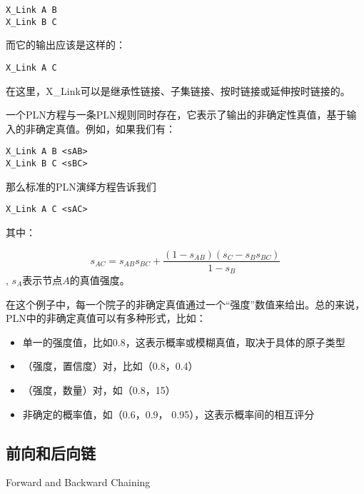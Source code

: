 {\tt\begin{small}\begin{lstlisting}
X_Link A B
X_Link B C
\end{lstlisting}\end{small}}

而它的输出应该是这样的：

{\tt\begin{small}\begin{lstlisting}
X_Link A C
\end{lstlisting}\end{small}}

在这里，X\_Link可以是继承性链接、子集链接、按时链接或延伸按时链接的。

一个PLN方程与一条PLN规则同时存在，它表示了输出的非确定性真值，基于输入的非确定真值。例如，如果我们有：

{\tt\begin{small}\begin{lstlisting}
X_Link A B <sAB>
X_Link B C <sBC>
\end{lstlisting}\end{small}}



那么标准的PLN演绎方程告诉我们

{\tt\begin{small}\begin{lstlisting}
X_Link A C <sAC>
\end{lstlisting}\end{small}}

其中： 

$$
s_{AC}=s_{AB}s_{BC}+\frac{\left(1-s_{AB}\right)\left(s_C-s_Bs_{BC}\right)}{1-s_B}
$$, $s_A$表示节点$A$的真值强度。

在这个例子中，每一个院子的非确定真值通过一个“强度”数值来给出。总的来说，PLN中的非确定真值可以有多种形式，比如：

\begin{itemize}
\item 单一的强度值，比如0.8，这表示概率或模糊真值，取决于具体的原子类型
\item （强度，置信度）对，比如（0.8，0.4）
\item （强度，数量）对，如（0.8，15）
\item 非确定的概率值，如（0.6，0.9， 0.95），这表示概率间的相互评分
\end{itemize}

\subsection{前向和后向链}{Forward and Backward Chaining}

